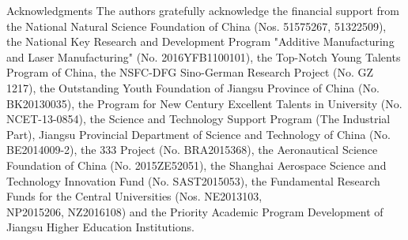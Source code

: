 \documentclass[10pt]{article}
\begin{document}
Acknowledgments The authors gratefully acknowledge the financial support from the National Natural Science Foundation of China (Nos. 51575267, 51322509), the National Key Research and Development Program "Additive Manufacturing and Laser Manufacturing" (No. 2016YFB1100101), the Top-Notch Young Talents Program of China, the NSFC-DFG Sino-German Research Project (No. GZ 1217), the Outstanding Youth Foundation of Jiangsu Province of China (No. BK20130035), the Program for New Century Excellent Talents in University (No. NCET-13-0854), the Science and Technology Support Program (The Industrial Part), Jiangsu Provincial Department of Science and Technology of China (No. BE2014009-2), the 333 Project (No. BRA2015368), the Aeronautical Science Foundation of China (No. 2015ZE52051), the Shanghai Aerospace Science and Technology Innovation Fund (No. SAST2015053), the Fundamental Research Funds for the Central Universities (Nos. NE2013103,\\
NP2015206, NZ2016108) and the Priority Academic Program Development of Jiangsu Higher Education Institutions.
\end{document}
